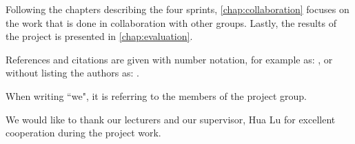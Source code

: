 Following the chapters describing the four sprints, \cref{chap:collaboration} focuses on the work that is done in collaboration with other groups.
Lastly, the results of the project is presented in \cref{chap:evaluation}.

References and citations are given with number notation, for example as: \citet{launcher2011}, or without listing the authors as: \cite{launcher2011}. 

When writing ``we", it is referring to the members of the project group.

We would like to thank our lecturers and our supervisor, Hua Lu for excellent cooperation during the project work.

